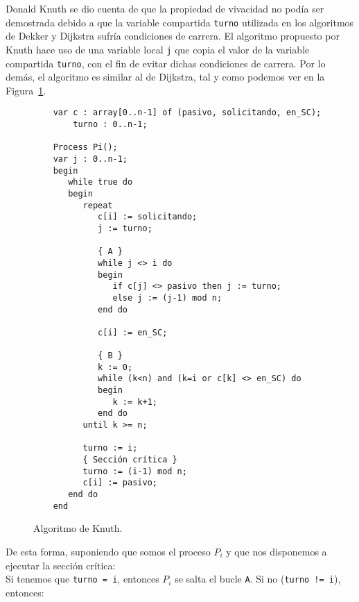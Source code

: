 Donald Knuth se dio cuenta de que la propiedad de vivacidad no podía ser demostrada debido a que la variable compartida \verb|turno| utilizada en los algoritmos de Dekker y Dijkstra sufría condiciones de carrera. El algoritmo propuesto por Knuth hace uso de una variable local \verb|j| que copia el valor de la variable compartida \verb|turno|, con el fin de evitar dichas condiciones de carrera. Por lo demás, el algoritmo es similar al de Dijkstra, tal y como podemos ver en la Figura~\ref{fig:cod_knuth}.

\begin{figure}[H]
\begin{verbatim}
    var c : array[0..n-1] of (pasivo, solicitando, en_SC);
        turno : 0..n-1;

    Process Pi();
    var j : 0..n-1;
    begin
       while true do
       begin
          repeat
             c[i] := solicitando;
             j := turno;

             { A }
             while j <> i do
             begin
                if c[j] <> pasivo then j := turno;
                else j := (j-1) mod n;
             end do

             c[i] := en_SC;

             { B }
             k := 0;
             while (k<n) and (k=i or c[k] <> en_SC) do
             begin
                k := k+1;
             end do
          until k >= n;

          turno := i;
          { Sección crítica }
          turno := (i-1) mod n;
          c[i] := pasivo;
       end do
    end
\end{verbatim}
\caption{Algoritmo de Knuth.}
\label{fig:cod_knuth}
\end{figure}
De esta forma, suponiendo que somos el proceso $P_i$ y que nos disponemos a ejecutar la sección crítica:\\
Si tenemos que \verb|turno = i|, entonces $P_i$ se salta el bucle \verb|A|. Si no (\verb|turno != i|), entonces:
